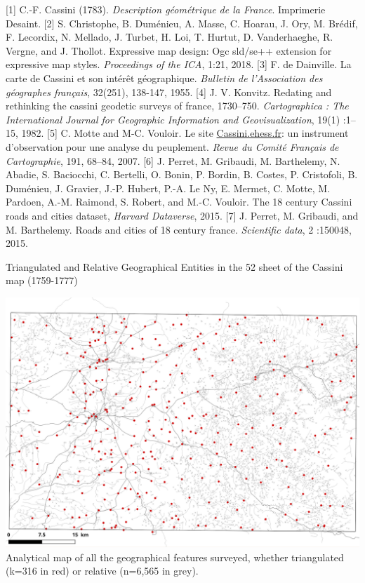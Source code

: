 \documentclass[portrait,a0]{sciposter}
\begin{document}
\begin{minipage}[b]{\textwidth}
\begin{multicols}{3}
    \vfill
    \small
    [1] C.-F. Cassini (1783). \textit{Description géométrique de la France}. Imprimerie Desaint.
    [2] S. Christophe, B. Duménieu, A. Masse, C. Hoarau, J. Ory, M. Brédif, F. Lecordix, N. Mellado, J. Turbet, H. Loi, T. Hurtut, D. Vanderhaeghe, R. Vergne, and J. Thollot. Expressive map design: Ogc sld/se++ extension for expressive map styles. \textit{Proceedings of the ICA}, 1:21, 2018.
    [3] F. de Dainville. La carte de Cassini et son intérêt géographique. \textit{Bulletin de l'Association des géographes français}, 32(251), 138-147, 1955.
    [4] J. V. Konvitz. Redating and rethinking the cassini geodetic surveys of france, 1730–750. \textit{Cartographica : The International Journal for Geographic Information and Geovisualization}, 19(1) :1–15, 1982.
    [5] C. Motte and M-C. Vouloir. Le site \href{http://cassini.ehess.fr}{Cassini.ehess.fr}: un instrument d’observation pour une analyse du peuplement. \textit{Revue du Comité Français de Cartographie}, 191, 68–84, 2007.
    [6] J. Perret, M. Gribaudi, M. Barthelemy, N. Abadie, S. Baciocchi, C. Bertelli, O. Bonin, P. Bordin, B. Costes, P. Cristofoli, B. Duménieu, J. Gravier, J.-P. Hubert, P.-A. Le Ny, E. Mermet, C. Motte, M. Pardoen, A.-M. Raimond, S. Robert, and M.-C. Vouloir. The 18 century Cassini roads and cities dataset, \textit{Harvard Dataverse}, 2015.
    [7] J. Perret, M. Gribaudi, and M. Barthelemy. Roads and cities of 18 century france. \textit{Scientific data}, 2 :150048, 2015.
    \begin{center}
      \captionsetup{type=figure}
      \caption{Triangulated and Relative Geographical Entities in the 52 sheet of the Cassini map (1759-1777)}
      \label{map:triangulated-relative}
      \vspace{-0.5cm}\includegraphics[width=0.9\linewidth,trim= 0cm 0cm 0cm 2cm, clip]{gfx/Triangulated.png}
      \vfill
      \footnotesize
      Analytical map of all the geographical features surveyed, whether triangulated (k=316 in red) or relative (n=6,565 in grey).
    \end{center}
  \end{multicols}
\end{minipage}
\end{document}
